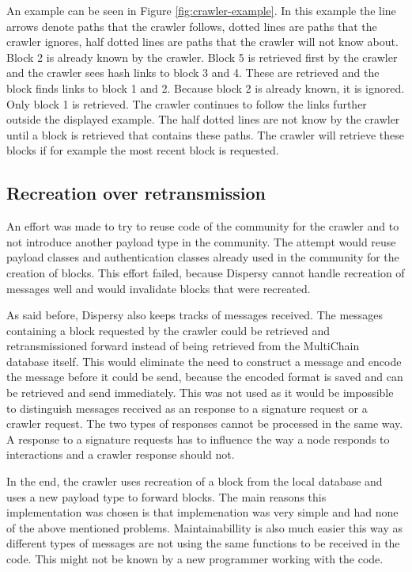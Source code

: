 An example can be seen in Figure \ref{fig:crawler-example}.
In this example the line arrows denote paths that the crawler follows,
dotted lines are paths that the crawler ignores,
half dotted lines are paths that the crawler will not know about.
Block 2 is already known by the crawler.
Block 5 is retrieved first by the crawler and the crawler sees hash links to block 3 and 4.
These are retrieved and the block finds links to block 1 and 2.
Because block 2 is already known, it is ignored.
Only block 1 is retrieved.
The crawler continues to follow the links further outside the displayed example.
The half dotted lines are not know by the crawler until a block is retrieved that contains these paths.
The crawler will retrieve these blocks if for example the most recent block is requested.

\subsection{Recreation over retransmission}
An effort was made to try to reuse code of the community for the crawler and to not introduce another payload type in the community.
The attempt would reuse payload classes and authentication classes already used in the community for the creation of blocks.
This effort failed, because Dispersy cannot handle recreation of messages well
and would invalidate blocks that were recreated.

As said before, Dispersy also keeps tracks of messages received.
The messages containing a block requested by the crawler could be retrieved and retransmissioned forward
instead of being retrieved from the MultiChain database itself.
This would eliminate the need to construct a message and encode the message before it could be send,
because the encoded format is saved and can be retrieved and send immediately.
This was not used as it would be impossible to distinguish messages received as an response to a signature request or a crawler request.
The two types of responses cannot be processed in the same way.
A response to a signature requests has to influence the way a node responds to interactions
and a crawler response should not.

In the end, the crawler uses recreation of a block from the local database and uses a new payload type to forward blocks.
The main reasons this implementation was chosen is
that implemenation was very simple and had none of the above mentioned problems.
Maintainabillity is also much easier this way
as different types of messages are not using the same functions to be received in the code.
This might not be known by a new programmer working with the code.

